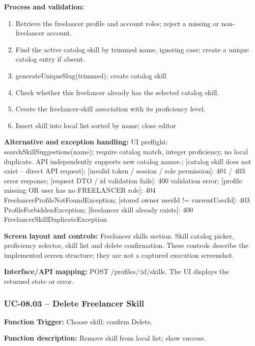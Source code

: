 \textbf{Process and validation:}
\begin{enumerate}
\item Retrieve the freelancer profile and account roles; reject a missing or non-freelancer account.
\item Find the active catalog skill by trimmed name, ignoring case; create a unique catalog entry if absent.
\item generate\allowbreak{}Unique\allowbreak{}Slug(trimmed); create catalog skill
\item Check whether this freelancer already has the selected catalog skill.
\item Create the freelancer-skill association with its proficiency level.
\item Insert skill into local list sorted by name; close editor
\end{enumerate}
\textbf{Alternative and exception handling:} UI preflight: search\allowbreak{}Skill\allowbreak{}Suggestions(name); require catalog match, integer proficiency, no local duplicate. API independently supports new catalog names.; [catalog skill does not exist -- direct API request]; [invalid token /\allowbreak{} session /\allowbreak{} role permission]: 401 /\allowbreak{} 403 error response; [request DTO /\allowbreak{} id validation fails]: 400 validation error; [profile missing OR user has no FREELANCER role]: 404 Freelancer\allowbreak{}Profile\allowbreak{}Not\allowbreak{}Found\allowbreak{}Exception; [stored owner user\allowbreak{}Id !=\allowbreak{} current\allowbreak{}User\allowbreak{}Id]: 403 Profile\allowbreak{}Forbidden\allowbreak{}Exception; [freelancer skill already exists]: 400 Freelancer\allowbreak{}Skill\allowbreak{}Duplicate\allowbreak{}Exception

\textbf{Screen layout and controls:} Freelancer skills section. Skill catalog picker, proficiency selector, skill list and delete confirmation. These controls describe the implemented screen structure; they are not a captured execution screenshot.

\textbf{Interface/\allowbreak{}API mapping:} POST /\allowbreak{}profiles/\allowbreak{}:id/\allowbreak{}skills. The UI displays the returned state or error.

\subsubsection{UC-08.03 -- Delete Freelancer Skill}
\textbf{Function Trigger:} Choose skill; confirm Delete.

\textbf{Function description:} Remove skill from local list; show success.

